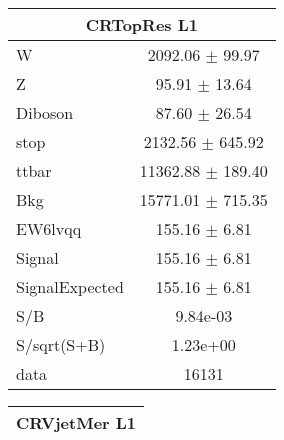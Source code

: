 \begin{table}
\begin{tabular}{|l|c|}
\hline
\multicolumn{2}{|c|}{CRTopRes L1}\\ \hline
W & 2092.06 $\pm$ 99.97\\
Z & 95.91 $\pm$ 13.64\\
Diboson & 87.60 $\pm$ 26.54\\
stop & 2132.56 $\pm$ 645.92\\
ttbar & 11362.88 $\pm$ 189.40\\
\hline
Bkg & 15771.01 $\pm$ 715.35\\
\hline
EW6lvqq & 155.16 $\pm$ 6.81\\
\hline
Signal & 155.16 $\pm$ 6.81\\
SignalExpected & 155.16 $\pm$ 6.81\\
\hline
S/B & 9.84e-03\\
S/sqrt(S+B) & 1.23e+00\\
\hline
data & 16131\\ \hline
\end{tabular} 
\begin{tabular}{|l|c|}
\hline
\multicolumn{2}{|c|}{CRVjetMer L1}\\ \hline


\end{tabular}
\end{table}
